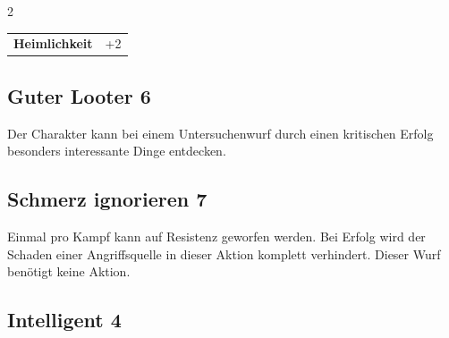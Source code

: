 \begin{multicols}{2}
\begin{tcolorbox}
\begin{tabular}{@{}ll@{}}
    \textbf{Heimlichkeit} & +2\\
\end{tabular}


\end{tcolorbox}

\begin{tcolorbox}
    \subsection*{Guter Looter \hfill \small{6 }}
    \tcblower
Der Charakter kann bei einem Untersuchenwurf durch einen kritischen Erfolg besonders interessante  Dinge entdecken.


\vspace{3mm}



\end{tcolorbox}

\begin{tcolorbox}
    \subsection*{Schmerz ignorieren \hfill \small{7 }}
    \tcblower
Einmal pro Kampf kann auf Resistenz geworfen werden. Bei Erfolg wird der Schaden einer Angriffsquelle in dieser Aktion komplett verhindert. Dieser Wurf benötigt keine Aktion.


\vspace{3mm}



\end{tcolorbox}

\begin{tcolorbox}
    \subsection*{Intelligent \hfill \small{4 }}
    \tcblower



\end{tcolorbox}
\end{multicols}
